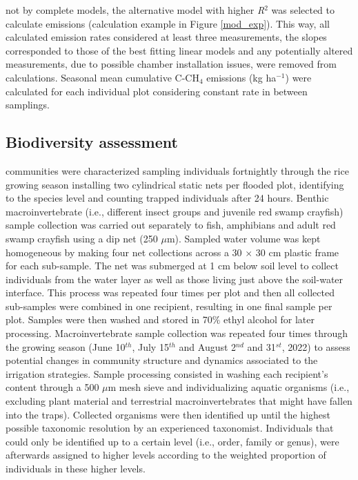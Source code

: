 not by complete models, the alternative model with higher \textit{R}$^2$ was selected to calculate emissions (calculation example in Figure \ref{mod_exp}). This way, all calculated emission rates considered at least three measurements, the slopes corresponded to those of the best fitting linear models and any potentially altered measurements, due to possible chamber installation issues, were removed from calculations. Seasonal mean cumulative C-CH$_{4}$ emissions (kg ha$^{-1}$) were calculated for each individual plot considering constant rate in between samplings. \\

\subsection{Biodiversity assessment}
\label{sec:meth_BIO1}

 communities  were characterized sampling individuals fortnightly through the rice growing season installing two cylindrical static nets per flooded plot, identifying to the species level and counting trapped individuals after 24 hours. Benthic macroinvertebrate (i.e., different insect groups and juvenile red swamp crayfish) sample collection was carried out separately to fish, amphibians and adult red swamp crayfish using a dip net (250 $\mu$m). Sampled water volume was kept homogeneous by making four net collections across a 30 $\times$ 30 cm plastic frame for each sub-sample. The net was submerged at 1 cm below soil level to collect individuals from the water layer as well as those living just above the soil-water interface. This process was repeated four times per plot and then all collected sub-samples were combined in one recipient, resulting in one final sample per plot. Samples were then washed and stored in 70$\%$ ethyl alcohol for later processing. Macroinvertebrate sample collection was repeated four times through the growing season (June 10$^{th}$, July 15$^{th}$ and August 2$^{nd}$ and 31$^{st}$, 2022) to assess potential changes in community structure and dynamics associated to the irrigation strategies. Sample processing consisted in washing each recipient's content through a 500 $\mu$m mesh sieve and individualizing aquatic organisms (i.e., excluding plant material and terrestrial macroinvertebrates that might have fallen into the traps). Collected organisms were then identified up until the highest possible taxonomic resolution by an experienced taxonomist. Individuals that could only be identified up to a certain level (i.e., order, family or genus), were afterwards assigned to higher levels according to the weighted proportion of individuals in these higher levels.

